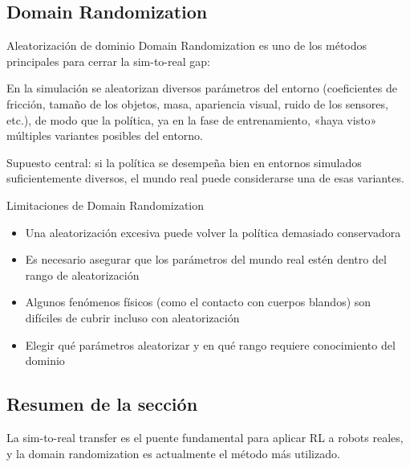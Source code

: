 \subsection{Domain Randomization}

\begin{importantbox}{Aleatorización de dominio}
Domain Randomization es uno de los métodos principales para cerrar la sim-to-real gap:

En la simulación se aleatorizan diversos parámetros del entorno (coeficientes de fricción, tamaño de los objetos, masa, apariencia visual, ruido de los sensores, etc.), de modo que la política, ya en la fase de entrenamiento, «haya visto» múltiples variantes posibles del entorno.

Supuesto central: si la política se desempeña bien en entornos simulados suficientemente diversos, el mundo real puede considerarse una de esas variantes.
\end{importantbox}

\begin{warningbox}{Limitaciones de Domain Randomization}
\begin{itemize}
    \item Una aleatorización excesiva puede volver la política demasiado conservadora
    \item Es necesario asegurar que los parámetros del mundo real estén dentro del rango de aleatorización
    \item Algunos fenómenos físicos (como el contacto con cuerpos blandos) son difíciles de cubrir incluso con aleatorización
    \item Elegir qué parámetros aleatorizar y en qué rango requiere conocimiento del dominio
\end{itemize}
\end{warningbox}

\subsection{Resumen de la sección}

La sim-to-real transfer es el puente fundamental para aplicar RL a robots reales, y la domain randomization es actualmente el método más utilizado.

